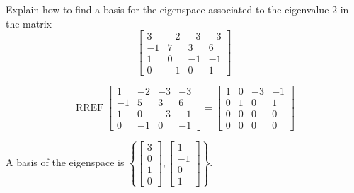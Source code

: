 
\begin{exerciseStatement}


Explain how to find a basis for the eigenspace associated to the eigenvalue \( 2 \) in the matrix \[ \left[\begin{array}{cccc}
3 & -2 & -3 & -3 \\
-1 & 7 & 3 & 6 \\
1 & 0 & -1 & -1 \\
0 & -1 & 0 & 1
\end{array}\right] \]


\end{exerciseStatement}
    
\begin{exerciseAnswer} 


\[\operatorname{RREF} \left[\begin{array}{cccc}
1 & -2 & -3 & -3 \\
-1 & 5 & 3 & 6 \\
1 & 0 & -3 & -1 \\
0 & -1 & 0 & -1
\end{array}\right] = \left[\begin{array}{cccc}
1 & 0 & -3 & -1 \\
0 & 1 & 0 & 1 \\
0 & 0 & 0 & 0 \\
0 & 0 & 0 & 0
\end{array}\right] \]



A basis of the eigenspace is \( \left\{ \left[\begin{array}{c}
3 \\
0 \\
1 \\
0
\end{array}\right] , \left[\begin{array}{c}
1 \\
-1 \\
0 \\
1
\end{array}\right] \right\} \).


\end{exerciseAnswer}
    
